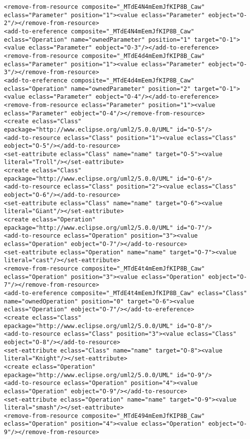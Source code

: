 \begin{lstlisting}[style=cbpfile,caption={Change-based representation of the model in Figure \ref{fig:class_diagram_left}.},label=lst:class_diagram_left_cbpfile]
<remove-from-resource composite="_MTdE4N4mEemJfKIP8B_Caw" eclass="Parameter" position="1"><value eclass="Parameter" eobject="O-2"/></remove-from-resource>
<add-to-ereference composite="_MTdE4N4mEemJfKIP8B_Caw" eclass="Operation" name="ownedParameter" position="1" target="O-1"><value eclass="Parameter" eobject="O-3"/></add-to-ereference>
<remove-from-resource composite="_MTdE4d4mEemJfKIP8B_Caw" eclass="Parameter" position="1"><value eclass="Parameter" eobject="O-3"/></remove-from-resource>
<add-to-ereference composite="_MTdE4d4mEemJfKIP8B_Caw" eclass="Operation" name="ownedParameter" position="2" target="O-1"><value eclass="Parameter" eobject="O-4"/></add-to-ereference>
<remove-from-resource eclass="Parameter" position="1"><value eclass="Parameter" eobject="O-4"/></remove-from-resource>
<create eclass="Class" epackage="http://www.eclipse.org/uml2/5.0.0/UML" id="O-5"/>
<add-to-resource eclass="Class" position="1"><value eclass="Class" eobject="O-5"/></add-to-resource>
<set-eattribute eclass="Class" name="name" target="O-5"><value literal="Troll"/></set-eattribute>
<create eclass="Class" epackage="http://www.eclipse.org/uml2/5.0.0/UML" id="O-6"/>
<add-to-resource eclass="Class" position="2"><value eclass="Class" eobject="O-6"/></add-to-resource>
<set-eattribute eclass="Class" name="name" target="O-6"><value literal="Giant"/></set-eattribute>
<create eclass="Operation" epackage="http://www.eclipse.org/uml2/5.0.0/UML" id="O-7"/>
<add-to-resource eclass="Operation" position="3"><value eclass="Operation" eobject="O-7"/></add-to-resource>
<set-eattribute eclass="Operation" name="name" target="O-7"><value literal="cast"/></set-eattribute>
<remove-from-resource composite="_MTdE4t4mEemJfKIP8B_Caw" eclass="Operation" position="3"><value eclass="Operation" eobject="O-7"/></remove-from-resource>
<add-to-ereference composite="_MTdE4t4mEemJfKIP8B_Caw" eclass="Class" name="ownedOperation" position="0" target="O-6"><value eclass="Operation" eobject="O-7"/></add-to-ereference>
<create eclass="Class" epackage="http://www.eclipse.org/uml2/5.0.0/UML" id="O-8"/>
<add-to-resource eclass="Class" position="3"><value eclass="Class" eobject="O-8"/></add-to-resource>
<set-eattribute eclass="Class" name="name" target="O-8"><value literal="Knight"/></set-eattribute>
<create eclass="Operation" epackage="http://www.eclipse.org/uml2/5.0.0/UML" id="O-9"/>
<add-to-resource eclass="Operation" position="4"><value eclass="Operation" eobject="O-9"/></add-to-resource>
<set-eattribute eclass="Operation" name="name" target="O-9"><value literal="smash"/></set-eattribute>
<remove-from-resource composite="_MTdE494mEemJfKIP8B_Caw" eclass="Operation" position="4"><value eclass="Operation" eobject="O-9"/></remove-from-resource>

\end{lstlisting}
